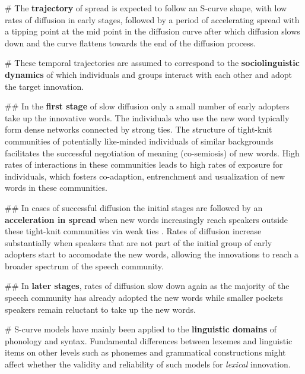 \documentclass[
  a4paper,
  ]{scrartcl}
\renewcommand{\hw}[1]{\textbf{#1}}
\begin{document}
    \begin{easylist}[itemize]

      # The \hw{trajectory} of spread is expected to follow an S-curve shape, with low rates of diffusion in early stages, followed by a period of accelerating spread with a tipping point at the mid point in the diffusion curve after which diffusion slows down and the curve flattens towards the end of the diffusion process.

      # These temporal trajectories are assumed to correspond to the \hw{sociolinguistic dynamics} of which individuals and groups interact with each other and adopt the target innovation.

        ## In the \hw{first stage} of slow diffusion only a small number of early adopters take up the innovative words. The individuals who use the new word typically form dense networks connected by strong ties. The structure of tight-knit communities of potentially like-minded individuals of similar backgrounds facilitates the successful negotiation of meaning (co-semiosis) of new words. High rates of interactions in these communities leads to high rates of exposure for individuals, which fosters co-adaption, entrenchment and usualization of new words in these communities.

        ## In cases of successful diffusion the initial stages are followed by an \hw{acceleration in spread} when new words increasingly reach speakers outside these tight-knit communities via weak ties \parencite{Granovetter1977}. Rates of diffusion increase substantially when speakers that are not part of the initial group of early adopters start to accomodate the new words, allowing the innovations to reach a broader spectrum of the speech community.

        ## In \hw{later stages}, rates of diffusion slow down again as the majority of the speech community has already adopted the new words while smaller pockets speakers remain reluctant to take up the new words.

      # S-curve models have mainly been applied to the \hw{linguistic domains} of phonology and syntax. Fundamental differences between lexemes and linguistic items on other levels such as phonemes and grammatical constructions might affect whether the validity and reliability of such models for \emph{lexical} innovation.


\end{easylist}
\end{document}
